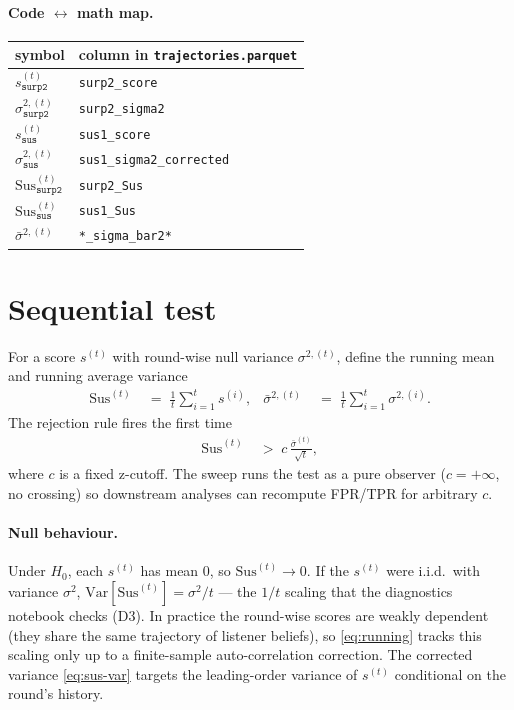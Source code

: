 \documentclass[11pt]{article}
\newcommand{\Var}{\mathrm{Var}}
\begin{document}
\paragraph{Code $\leftrightarrow$ math map.}
\begin{center}
\begin{tabular}{ll}
\toprule
symbol & column in \texttt{trajectories.parquet} \\
\midrule
$s^{(t)}_{\texttt{surp2}}$                        & \texttt{surp2\_score} \\
$\sigma^{2,(t)}_{\texttt{surp2}}$                 & \texttt{surp2\_sigma2} \\
$s^{(t)}_{\texttt{sus}}$                          & \texttt{sus1\_score} \\
$\sigma^{2,(t)}_{\texttt{sus}}$                   & \texttt{sus1\_sigma2\_corrected} \\
$\mathrm{Sus}^{(t)}_{\texttt{surp2}}$             & \texttt{surp2\_Sus} \\
$\mathrm{Sus}^{(t)}_{\texttt{sus}}$               & \texttt{sus1\_Sus} \\
$\bar{\sigma}^{2,(t)}$                            & \texttt{*\_sigma\_bar2*} \\
\bottomrule
\end{tabular}
\end{center}

\section{Sequential test}

For a score $s^{(t)}$ with round-wise null variance $\sigma^{2,(t)}$,
define the running mean and running average variance
\begin{align}
    \mathrm{Sus}^{(t)}
    &\;=\;
    \frac{1}{t}\sum_{i=1}^{t} s^{(i)},
    & \bar{\sigma}^{2,(t)}
    &\;=\;
    \frac{1}{t}\sum_{i=1}^{t} \sigma^{2,(i)}.
    \label{eq:running}
\end{align}
The rejection rule fires the first time
\begin{align}
    \mathrm{Sus}^{(t)}
    &\;>\;
    c\, \frac{\bar{\sigma}^{(t)}}{\sqrt{t}},
    \label{eq:crossing}
\end{align}
where $c$ is a fixed z-cutoff. The sweep runs the test as a pure
observer ($c = +\infty$, no crossing) so downstream analyses can
recompute FPR/TPR for arbitrary $c$.

\paragraph{Null behaviour.} Under $H_0$, each $s^{(t)}$ has mean $0$, so
$\mathrm{Sus}^{(t)} \to 0$. If the $s^{(t)}$ were i.i.d.\ with variance
$\sigma^{2}$, $\Var[\mathrm{Sus}^{(t)}] = \sigma^{2}/t$ — the $1/t$
scaling that the diagnostics notebook checks (D3). In practice the
round-wise scores are weakly dependent (they share the same trajectory
of listener beliefs), so \eqref{eq:running} tracks this scaling only up
to a finite-sample auto-correlation correction. The corrected variance
\eqref{eq:sus-var} targets the leading-order variance of $s^{(t)}$
conditional on the round's history.
\end{document}
